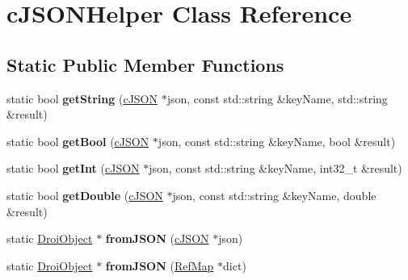 \hypertarget{classc_j_s_o_n_helper}{}\section{c\+J\+S\+O\+N\+Helper Class Reference}
\label{classc_j_s_o_n_helper}
\subsection*{Static Public Member Functions}
\begin{DoxyCompactItemize}
\item 
\mbox{\label{classc_j_s_o_n_helper_a8af66e023859585cc7e8b49ced131c05}} 
static bool {\bfseries get\+String} (\hyperlink{structc_j_s_o_n}{c\+J\+S\+ON} $\ast$json, const std\+::string \&key\+Name, std\+::string \&result)
\item 
\mbox{\label{classc_j_s_o_n_helper_a00c79278ea63a082225ac97091304504}} 
static bool {\bfseries get\+Bool} (\hyperlink{structc_j_s_o_n}{c\+J\+S\+ON} $\ast$json, const std\+::string \&key\+Name, bool \&result)
\item 
\mbox{\label{classc_j_s_o_n_helper_a3d57eb8b7c218a02686a857256ce9e29}} 
static bool {\bfseries get\+Int} (\hyperlink{structc_j_s_o_n}{c\+J\+S\+ON} $\ast$json, const std\+::string \&key\+Name, int32\+\_\+t \&result)
\item 
\mbox{\label{classc_j_s_o_n_helper_af4596d007d50c80cedf39458f0bf5653}} 
static bool {\bfseries get\+Double} (\hyperlink{structc_j_s_o_n}{c\+J\+S\+ON} $\ast$json, const std\+::string \&key\+Name, double \&result)
\item 
\mbox{\label{classc_j_s_o_n_helper_a0fb430e0588b9d085085c4ef5f1328d2}} 
static \hyperlink{class_droi_object}{Droi\+Object} $\ast$ {\bfseries from\+J\+S\+ON} (\hyperlink{structc_j_s_o_n}{c\+J\+S\+ON} $\ast$json)
\item 
\mbox{\label{classc_j_s_o_n_helper_a0fb74bcdbb4306f6e429d89597096eee}} 
static \hyperlink{class_droi_object}{Droi\+Object} $\ast$ {\bfseries from\+J\+S\+ON} (\hyperlink{class_ref_map}{Ref\+Map} $\ast$dict)
\item 

\end{DoxyCompactItemize}
